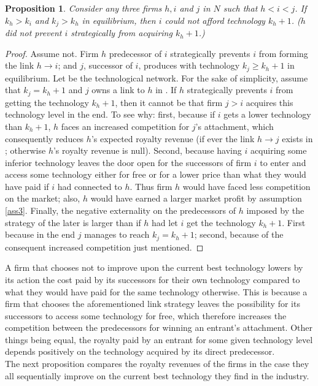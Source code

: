 \documentclass{article}
\newtheorem{proposition}{Proposition}
\begin{document}
\begin{proposition}
Consider any three firms $h,i$ and $j$ in $N$ such that $h<i<j$. If $k_h>k_i$ and $k_j>k_h$ in equilibrium, then $i$ could not afford technology $k_h+1$. ($h$ did not prevent $i$ strategically from acquiring $k_h+1$.)
\end{proposition}
\begin{proof}
Assume not. Firm $h$ predecessor of $i$ strategically prevents $i$ from forming the link $h\rightarrow i$; and $j$, successor of $i$, produces with technology $k_j\geq k_h+1$ in equilibrium. Let  be the technological network. For the sake of simplicity, assume that $k_j=k_h+1$ and $j$ owns a link to $h$ in . If $h$ strategically prevents $i$ from getting the technology $k_h+1$, then it cannot be that firm $j>i$ acquires this technology level in the end. To see why: first, because if $i$ gets a lower technology than $k_h+1$, $h$ faces an increased competition for $j$'s attachment, which consequently reduces $h$'s expected royalty revenue (if ever the link $h\rightarrow j$ exists in ; otherwise $h$'s royalty revenue is null). Second, because having $i$ acquiring some inferior technology leaves the door open for the successors of firm $i$ to enter and access some technology either for free or for a lower price than what they would have paid if $i$ had connected to $h$. Thus firm $h$ would have faced less competition on the market; also, $h$ would have earned a larger market profit by assumption \ref{ass3}. Finally, the negative externality on the predecessors of $h$ imposed by the strategy of the later is larger than if $h$ had let $i$ get the technology $k_h+1$. First because in the end $j$ manages to reach $k_j=k_h+1$; second, because of the consequent increased competition just mentioned.   
\end{proof}

A firm that chooses not to improve upon the current best technology lowers by its action the cost paid by its successors for their own technology compared to what they would have paid for the same technology otherwise. This is because a firm that chooses the aforementioned link strategy leaves the possibility for its successors to access some technology for free, which therefore increases the competition between the predecessors for winning an entrant's attachment. Other things being equal, the royalty paid by an entrant for some given technology level depends positively on the technology acquired by its direct predecessor. \\
\indent The next proposition compares the royalty revenues of the firms in the case they all sequentially improve on the current best technology they find in the industry.\\
\end{document}
